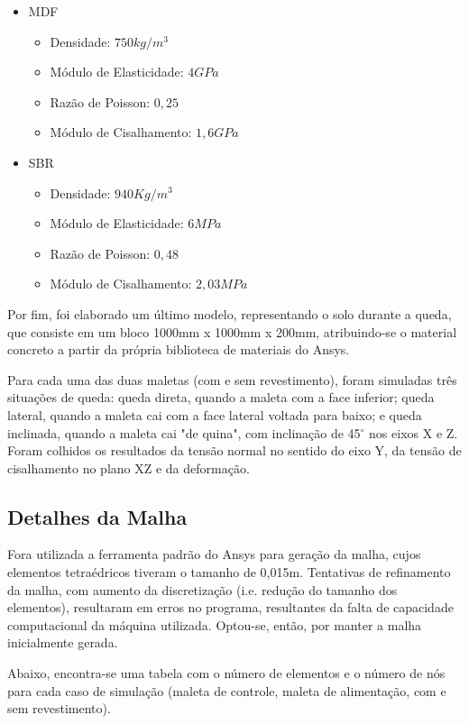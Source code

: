     \begin{itemize}
        \item MDF
        \begin{itemize}
            \item Densidade: $750 kg/m^3$
            \item Módulo de Elasticidade: $4 GPa$
            \item Razão de Poisson: $0,25$
            \item Módulo de Cisalhamento: $1,6 GPa$
        \end{itemize}
        \item SBR
        \begin{itemize}
            \item Densidade: $940 Kg/m^3$
            \item Módulo de Elasticidade: $ 6MPa$
            \item Razão de Poisson: $0,48$
            \item Módulo de Cisalhamento: $2,03 MPa$
        \end{itemize}
    \end{itemize}

\par Por fim, foi elaborado um último modelo, representando o solo durante a queda, que consiste em um bloco 1000mm x 1000mm x 200mm, atribuindo-se o material concreto a partir da própria biblioteca de materiais do Ansys.

\par Para cada uma das duas maletas (com e sem revestimento), foram simuladas três situações de queda: queda direta, quando a maleta com a face inferior; queda lateral, quando a maleta cai com a face lateral voltada para baixo; e queda inclinada, quando a maleta cai "de quina", com inclinação de 45$^{\circ}$ nos eixos X e Z. Foram colhidos os resultados da tensão normal no sentido do eixo Y, da tensão de cisalhamento no plano XZ e da deformação.

\subsection{Detalhes da Malha}

Fora utilizada a ferramenta padrão do Ansys para geração da malha, cujos elementos tetraédricos tiveram o tamanho de 0,015m. Tentativas de  refinamento da malha, com aumento da discretização (i.e. redução do tamanho dos elementos), resultaram em erros no programa, resultantes da falta de capacidade computacional da máquina utilizada. Optou-se, então, por manter a malha inicialmente gerada.
\par Abaixo, encontra-se uma tabela com o número de elementos e o número de nós para cada caso de simulação (maleta de controle, maleta de alimentação, com e sem revestimento).

